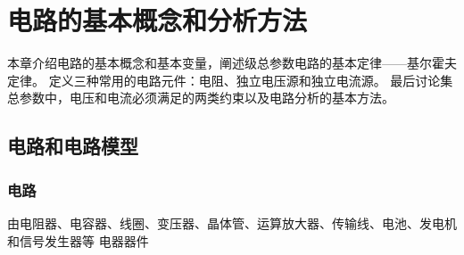 \chapter{电路的基本概念和分析方法}

本章介绍电路的基本概念和基本变量，阐述级总参数电路的基本定律——基尔霍夫定律。
定义三种常用的电路元件：电阻、独立电压源和独立电流源。
最后讨论集总参数中，电压和电流必须满足的两类约束以及电路分析的基本方法。

\section{电路和电路模型}
\subsection{电路}
由电阻器、电容器、线圈、变压器、晶体管、运算放大器、传输线、电池、发电机和信号发生器等
电器器件

